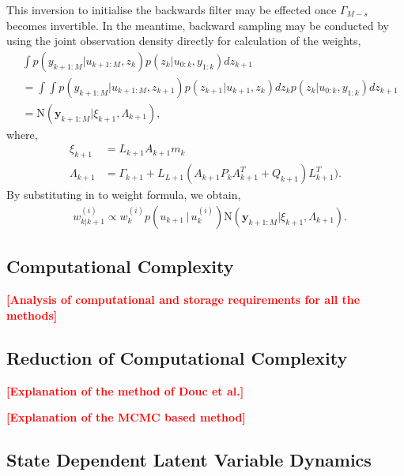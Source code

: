 \documentclass[twocolumn]{autart}    %
\newcommand{\comment}[1]{\textcolor{red}{\textbf{[#1]}}}
\begin{document}
This inversion to initialise the backwards filter may be effected once $\Gamma_{M-s}$ becomes invertible. In the meantime, backward sampling may be conducted by using the joint observation density directly for calculation of the weights,
%
\begin{equation}
\begin{split}
  &\int p(y_{k+1:M} | u_{k+1:M}, z_k) p(z_k | u_{0:k}, y_{1:k}) dz_{k+1} \\
  &= \int \int p(y_{k+1:M} | u_{k+1:M}, z_{k+1}) p(z_{k+1} | u_{k+1}, z_{k}) dz_k p(z_k | u_{0:k}, y_{1:k}) dz_{k+1} \\
  &= \mathrm{N}( \mathbf{y}_{k+1:M} | \xi_{k+1} , \Lambda_{k+1} )     ,
\end{split}
\end{equation}
%
where,
%
\begin{equation}
\begin{split}
  \xi_{k+1} &= L_{k+1} A_{k+1} m_k \\
  \Lambda_{k+1} &= \Gamma_{k+1} + L_{L+1} ( A_{k+1} P_k A_{k+1}^T + Q_{k+1} ) L_{k+1}^T )     .
\end{split}
\end{equation}
%
By substituting in to weight formula, we obtain,
%
\begin{equation}
\begin{split}
  &w_{k|k+1}^{(i)} \propto w^{(i)}_k p(u_{k+1}\,|\,u_{k}^{(i)}) \mathrm{N}( \mathbf{y}_{k+1:M} | \xi_{k+1} , \Lambda_{k+1} )     .
\end{split}
\end{equation}



\subsection{Computational Complexity}

\comment{Analysis of computational and storage requirements for all
  the methods}


\subsection{Reduction of Computational Complexity}

\comment{Explanation of the method of Douc et al.}

\comment{Explanation of the MCMC based method}


\subsection{State Dependent Latent Variable Dynamics}
\end{document}
